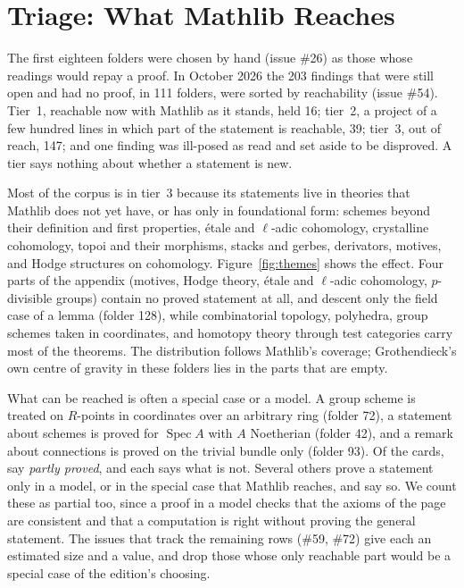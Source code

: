 \documentclass[runningheads,a4paper]{llncs}
\begin{document}


\section{Triage: What Mathlib Reaches}\label{sec:triage}

The first eighteen folders were chosen by hand (issue \#26) as those whose readings would repay a proof. In October 2026 the 203 findings that were still open and had no proof, in 111 folders, were sorted by reachability (issue \#54). Tier~1, reachable now with Mathlib as it stands, held 16; tier~2, a project of a few hundred lines in which part of the statement is reachable, 39; tier~3, out of reach, 147; and one finding was ill-posed as read and set aside to be disproved. A tier says nothing about whether a statement is new.

Most of the corpus is in tier~3 because its statements live in theories that Mathlib does not yet have, or has only in foundational form: schemes beyond their definition and first properties, étale and $\ell$-adic cohomology, crystalline cohomology, topoi and their morphisms, stacks and gerbes, derivators, motives, and Hodge structures on cohomology. Figure~\ref{fig:themes} shows the effect. Four parts of the appendix (motives, Hodge theory, étale and $\ell$-adic cohomology, $p$-divisible groups) contain no proved statement at all, and descent only the field case of a lemma (folder 128), while combinatorial topology, polyhedra, group schemes taken in coordinates, and homotopy theory through test categories carry most of the theorems. The distribution follows Mathlib's coverage; Grothendieck's own centre of gravity in these folders lies in the parts that are empty.

What can be reached is often a special case or a model. A group scheme is treated on $R$-points in coordinates over an arbitrary ring (folder 72), a statement about schemes is proved for $\operatorname{Spec} A$ with $A$ Noetherian (folder 42), and a remark about connections is proved on the trivial bundle only (folder 93). Of the \cntCards{} cards, \cntPartly{} say \emph{partly proved}, and each says what is not. Several others prove a statement only in a model, or in the special case that Mathlib reaches, and say so. We count these as partial too, since a proof in a model checks that the axioms of the page are consistent and that a computation is right without proving the general statement. The issues that track the remaining rows (\#59, \#72) give each an estimated size and a value, and drop those whose only reachable part would be a special case of the edition's choosing.
\end{document}

